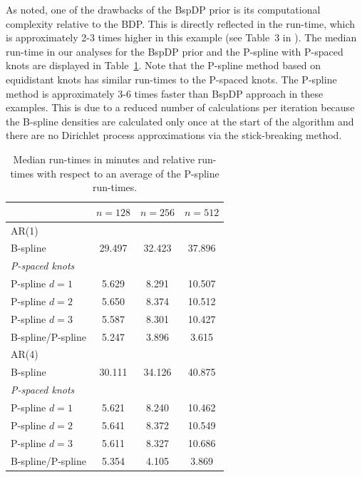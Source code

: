 \documentclass[twocolumn,final]{svjour3}
\begin{document}

As \cite{Edwards2018} noted, one of the drawbacks of the BspDP prior  is its computational complexity relative to the BDP.  This is directly reflected in the run-time, which is approximately 2-3 times higher in this example (see Table~3 in \cite{Edwards2018}).  The median run-time in our analyses for the BspDP prior and the P-spline with P-spaced knots are displayed in Table~\ref{table:sim_time}.  Note that the P-spline method based on equidistant knots has similar run-times to the P-spaced knots.  The P-spline method is approximately 3-6 times faster than BspDP approach in these examples.  This is due to a reduced number of calculations  per iteration because the B-spline densities are calculated only  once at the start of the algorithm and there are no Dirichlet process approximations via the stick-breaking method.  

\begin{table}
	\centering
		\begin{tabular}{lccc}
			\toprule
			& $n=128$ & $n=256$ & $n=512$ \\ \hline
			AR(1)     &  &  &  \\ 
			B-spline &   29.497 & 32.423 & 37.896 \\
			\textit{P-spaced knots}& & &   \\
			\hspace{0.5em}P-spline $d=1$& 5.629 & 8.291 & 10.507 \\
			\hspace{0.5em}P-spline $d=2$& 5.650 & 8.374 & 10.512 \\
			\hspace{0.5em}P-spline $d=3$& 5.587 & 8.301 & 10.427 \\ 
			B-spline/P-spline &  5.247 & 3.896 & 3.615 \\ \hline
			AR(4)     &  &  & \\ 
			B-spline & 30.111 & 34.126 & 40.875  \\
			\textit{P-spaced knots}& & &   \\
			\hspace{0.5em}P-spline $d=1$ & 5.621 & 8.240 & 10.462 \\
			\hspace{0.5em}P-spline $d=2$& 5.641 & 8.372 & 10.549 \\
			\hspace{0.5em}P-spline $d=3$& 5.611 & 8.327 & 10.686 \\
			B-spline/P-spline & 5.354 & 4.105 & 3.869 \\	
			\bottomrule
		\end{tabular}
	\caption{Median run-times in minutes and relative run-times with respect to an average of the P-spline run-times.}
	\label{table:sim_time}
\end{table}
\end{document}
